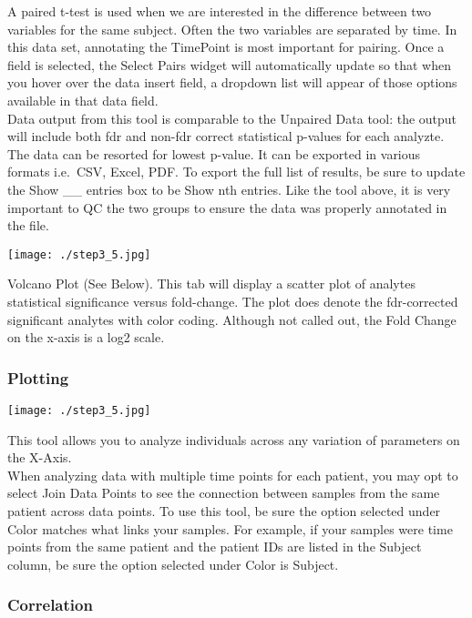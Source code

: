 \documentclass[]{article}
\begin{document}
A paired t-test is used when we are interested in the difference between
two variables for the same subject. Often the two variables are
separated by time. In this data set, annotating the TimePoint is most
important for pairing. Once a field is selected, the Select Pairs widget
will automatically update so that when you hover over the data insert
field, a dropdown list will appear of those options available in that
data field.\\
Data output from this tool is comparable to the Unpaired Data tool: the
output will include both fdr and non-fdr correct statistical p-values
for each analyzte. The data can be resorted for lowest p-value. It can
be exported in various formats i.e.~CSV, Excel, PDF. To export the full
list of results, be sure to update the Show \_\_ entries box to be Show
nth entries. Like the tool above, it is very important to QC the two
groups to ensure the data was properly annotated in the file.

\texttt{[image: ./step3\_5.jpg]}

Volcano Plot (See Below). This tab will display a scatter plot of
analytes statistical significance versus fold-change. The plot does
denote the fdr-corrected significant analytes with color coding.
Although not called out, the Fold Change on the x-axis is a log2 scale.

\newpage

\hypertarget{plotting}{%
\subsubsection{Plotting}\label{plotting}}

\texttt{[image: ./step3\_5.jpg]}

This tool allows you to analyze individuals across any variation of
parameters on the X-Axis.\\
When analyzing data with multiple time points for each patient, you may
opt to select Join Data Points to see the connection between samples
from the same patient across data points. To use this tool, be sure the
option selected under Color matches what links your samples. For
example, if your samples were time points from the same patient and the
patient IDs are listed in the Subject column, be sure the option
selected under Color is Subject.

\newpage

\hypertarget{correlation}{%
\subsubsection{Correlation}\label{correlation}}
\end{document}
